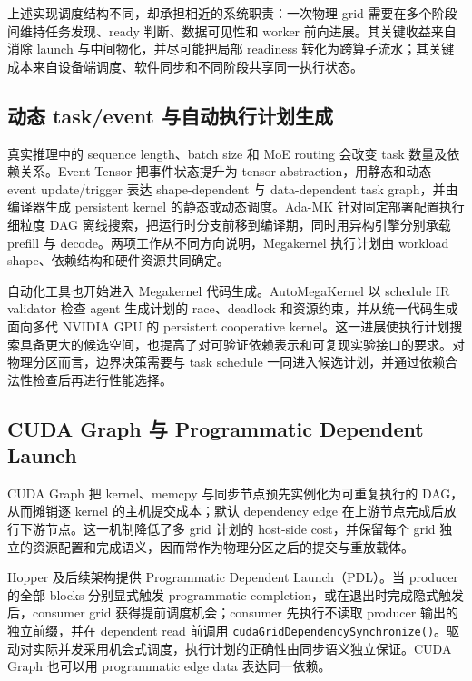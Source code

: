 上述实现调度结构不同，却承担相近的系统职责：一次物理 grid 需要在多个阶段间维持任务发现、ready 判断、数据可见性和 worker 前向进展。其关键收益来自消除 launch 与中间物化，并尽可能把局部 readiness 转化为跨算子流水；其关键成本来自设备端调度、软件同步和不同阶段共享同一执行状态。

\subsection{动态 task/event 与自动执行计划生成}

真实推理中的 sequence length、batch size 和 MoE routing 会改变 task 数量及依赖关系。Event Tensor 把事件状态提升为 tensor abstraction，用静态和动态 event update/trigger 表达 shape-dependent 与 data-dependent task graph，并由编译器生成 persistent kernel 的静态或动态调度\cite{eventTensor2026}。Ada-MK 针对固定部署配置执行细粒度 DAG 离线搜索，把运行时分支前移到编译期，同时用异构引擎分别承载 prefill 与 decode\cite{dong2026adamk}。两项工作从不同方向说明，Megakernel 执行计划由 workload shape、依赖结构和硬件资源共同确定。

自动化工具也开始进入 Megakernel 代码生成。AutoMegaKernel 以 schedule IR validator 检查 agent 生成计划的 race、deadlock 和资源约束，并从统一代码生成面向多代 NVIDIA GPU 的 persistent cooperative kernel\cite{jaber2026automegakernel}。这一进展使执行计划搜索具备更大的候选空间，也提高了对可验证依赖表示和可复现实验接口的要求。对物理分区而言，边界决策需要与 task schedule 一同进入候选计划，并通过依赖合法性检查后再进行性能选择。


\subsection{CUDA Graph 与 Programmatic Dependent Launch}

CUDA Graph 把 kernel、memcpy 与同步节点预先实例化为可重复执行的 DAG，从而摊销逐 kernel 的主机提交成本；默认 dependency edge 在上游节点完成后放行下游节点\cite{nvidia2026cudaGraphs}。这一机制降低了多 grid 计划的 host-side cost，并保留每个 grid 独立的资源配置和完成语义，因而常作为物理分区之后的提交与重放载体。

Hopper 及后续架构提供 Programmatic Dependent Launch（PDL）。当 producer 的全部 blocks 分别显式触发 programmatic completion，或在退出时完成隐式触发后，consumer grid 获得提前调度机会；consumer 先执行不读取 producer 输出的独立前缀，并在 dependent read 前调用 \texttt{cudaGridDependencySynchronize()}。驱动对实际并发采用机会式调度，执行计划的正确性由同步语义独立保证\cite{nvidia2026pdl}。CUDA Graph 也可以用 programmatic edge data 表达同一依赖。

